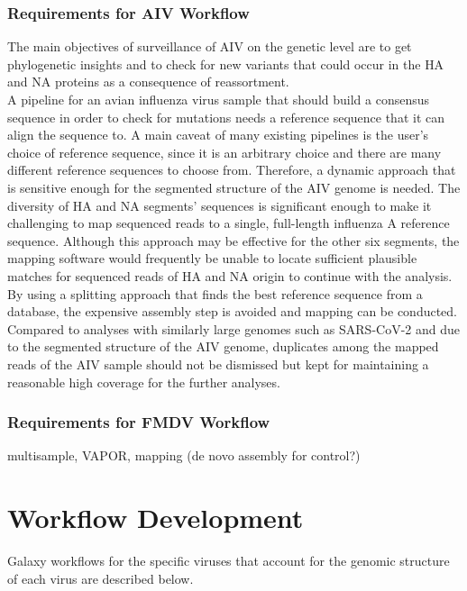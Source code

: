 \subsubsection{Requirements for AIV Workflow}
The main objectives of surveillance of \ac{AIV} on the genetic level are to get phylogenetic insights and to check for new variants that could occur in the \ac{HA} and \ac{NA} proteins as a consequence of reassortment. \\
A pipeline for an avian influenza virus sample that should build a consensus sequence in order to check for mutations needs a reference sequence that it can align the sequence to. A main caveat of many existing pipelines is the user's choice of reference sequence, since it is an arbitrary choice and there are many different reference sequences to choose from. Therefore, a dynamic approach that is sensitive enough for the segmented structure of the \ac{AIV} genome is needed. The diversity of \ac{HA} and \ac{NA} segments' sequences is significant enough to make it challenging to map sequenced reads to a single, full-length influenza A reference sequence. Although this approach may be effective for the other six segments, the mapping software would frequently be unable to locate sufficient plausible matches for sequenced reads of \ac{HA} and \ac{NA} origin to continue with the analysis. By using a splitting approach that finds the best reference sequence from a database, the expensive assembly step is avoided and mapping can be conducted. \\
Compared to analyses with similarly large genomes such as \ac{SARS-CoV-2} and due to the segmented structure of the \ac{AIV} genome, duplicates among the mapped reads of the \ac{AIV} sample should not be dismissed but kept for maintaining a reasonable high coverage for the further analyses. 

\subsubsection{Requirements for FMDV Workflow}
\todoit
multisample, VAPOR, mapping (de novo assembly for control?)

\section{Workflow Development}
Galaxy workflows for the specific viruses that account for the genomic structure of each virus are described below.

